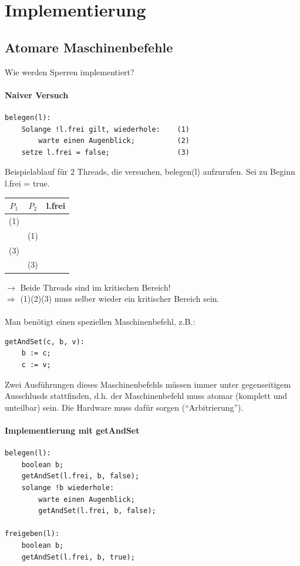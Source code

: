 \chapter{Implementierung}

\section{Atomare Maschinenbefehle}
Wie werden Sperren implementiert?

\subsubsection*{Naiver Versuch}
\begin{lstlisting}
belegen(l):
	Solange !l.frei gilt, wiederhole:    (1)
		warte einen Augenblick;          (2)
	setze l.frei = false;                (3)
\end{lstlisting}
Beispielablauf für 2 Threads, die versuchen, belegen(l) aufzurufen. Sei zu Beginn l.frei = true.
\begin{center}
\begin{tabular}{c c|c}
$P_1$ & $P_2$ & l.frei \\ \hline
(1) & \ & \ \\ 
\ & (1) & \ \\ 
(3) & \ & \ \\
\ & (3) & \ 
\end{tabular}
\end{center}
$\rightarrow$ Beide Threads sind im kritischen Bereich!\\
$\Rightarrow$ (1)(2)(3) muss selber wieder ein kritischer Bereich sein.\\
\\
Man benötigt einen speziellen Maschinenbefehl, z.B.:
\begin{lstlisting}
getAndSet(c, b, v):
	b := c;
	c := v;
\end{lstlisting}
Zwei Ausführungen dieses Maschinenbefehls müssen immer unter gegenseitigem Ausschlusds stattfinden, d.h. der Maschinenbefehl muss atomar (komplett und unteilbar) sein. Die Hardware muss dafür sorgen ("`Arbitrierung"').

\pagebreak

\subsubsection*{Implementierung mit getAndSet}
\begin{lstlisting}
belegen(l):
	boolean b;
	getAndSet(l.frei, b, false);
	solange !b wiederhole:
		warte einen Augenblick;
		getAndSet(l.frei, b, false);

freigeben(l):
	boolean b;
	getAndSet(l.frei, b, true);
\end{lstlisting}

